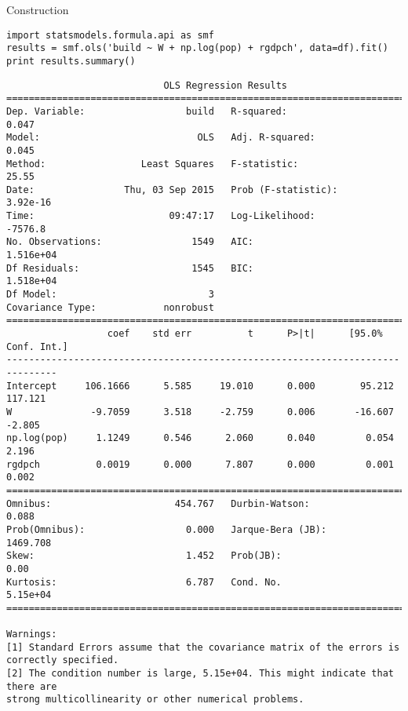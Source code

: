 \documentclass[12pt,fleqn]{article}\usepackage{common}
\begin{document}

Construction

\begin{verbatim}
import statsmodels.formula.api as smf
results = smf.ols('build ~ W + np.log(pop) + rgdpch', data=df).fit()
print results.summary()
\end{verbatim}

\begin{verbatim}
                            OLS Regression Results                            
==============================================================================
Dep. Variable:                  build   R-squared:                       0.047
Model:                            OLS   Adj. R-squared:                  0.045
Method:                 Least Squares   F-statistic:                     25.55
Date:                Thu, 03 Sep 2015   Prob (F-statistic):           3.92e-16
Time:                        09:47:17   Log-Likelihood:                -7576.8
No. Observations:                1549   AIC:                         1.516e+04
Df Residuals:                    1545   BIC:                         1.518e+04
Df Model:                           3                                         
Covariance Type:            nonrobust                                         
===============================================================================
                  coef    std err          t      P>|t|      [95.0% Conf. Int.]
-------------------------------------------------------------------------------
Intercept     106.1666      5.585     19.010      0.000        95.212   117.121
W              -9.7059      3.518     -2.759      0.006       -16.607    -2.805
np.log(pop)     1.1249      0.546      2.060      0.040         0.054     2.196
rgdpch          0.0019      0.000      7.807      0.000         0.001     0.002
==============================================================================
Omnibus:                      454.767   Durbin-Watson:                   0.088
Prob(Omnibus):                  0.000   Jarque-Bera (JB):             1469.708
Skew:                           1.452   Prob(JB):                         0.00
Kurtosis:                       6.787   Cond. No.                     5.15e+04
==============================================================================

Warnings:
[1] Standard Errors assume that the covariance matrix of the errors is correctly specified.
[2] The condition number is large, 5.15e+04. This might indicate that there are
strong multicollinearity or other numerical problems.
\end{verbatim}
\end{document}
